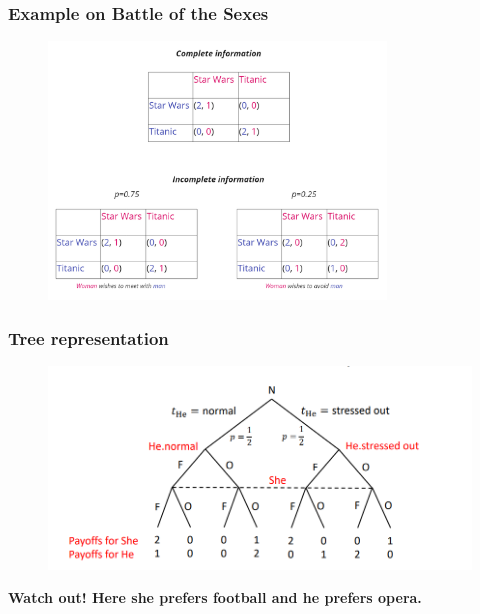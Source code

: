 \documentclass[11pt]{beamer}
\begin{document}
\begin{frame}
    \frametitle{Example on Battle of the Sexes}

    \begin{figure}
        \centering
        \includegraphics[width=0.8\textwidth]{assets/movies.png}
    \end{figure}
    
    \vspace{5mm}

\end{frame} 


\begin{frame}
    \frametitle{Tree representation}

    \begin{figure}
        \centering
        \includegraphics[width=1.0\textwidth]{assets/tree.png}
    \end{figure}
    
    \vspace{5mm}

    \textbf{Watch out! Here she prefers football and he prefers opera.}

\end{frame} 
\end{document}
